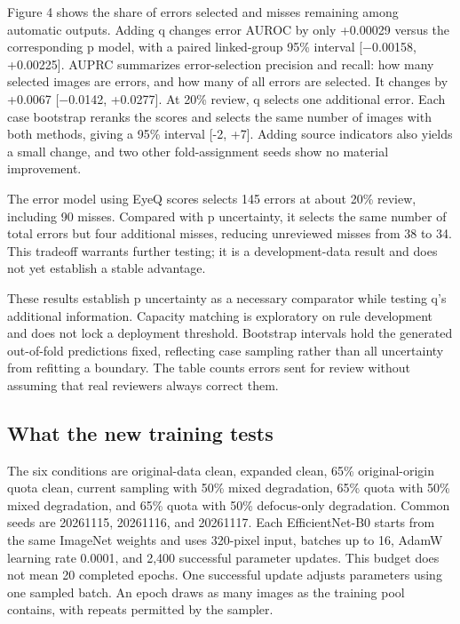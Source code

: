 \documentclass[
  10pt,
]{article}
\begin{document}
Figure 4 shows the share of errors selected and misses remaining among
automatic outputs. Adding q changes error AUROC by only +0.00029 versus
the corresponding p model, with a paired linked-group 95\% interval
{[}−0.00158, +0.00225{]}. AUPRC summarizes error-selection precision and
recall: how many selected images are errors, and how many of all errors
are selected. It changes by +0.0067 {[}−0.0142, +0.0277{]}. At 20\%
review, q selects one additional error. Each case bootstrap reranks the
scores and selects the same number of images with both methods, giving a
95\% interval {[}-2, +7{]}. Adding source indicators also yields a small
change, and two other fold-assignment seeds show no material
improvement.

The error model using EyeQ scores selects 145 errors at about 20\%
review, including 90 misses. Compared with p uncertainty, it selects the
same number of total errors but four additional misses, reducing
unreviewed misses from 38 to 34. This tradeoff warrants further testing;
it is a development-data result and does not yet establish a stable
advantage.

These results establish p uncertainty as a necessary comparator while
testing q's additional information. Capacity matching is exploratory on
rule development and does not lock a deployment threshold. Bootstrap
intervals hold the generated out-of-fold predictions fixed, reflecting
case sampling rather than all uncertainty from refitting a boundary. The
table counts errors sent for review without assuming that real reviewers
always correct them.

\subsection{What the new training
tests}\label{what-the-new-training-tests}

The six conditions are original-data clean, expanded clean, 65\%
original-origin quota clean, current sampling with 50\% mixed
degradation, 65\% quota with 50\% mixed degradation, and 65\% quota with
50\% defocus-only degradation. Common seeds are 20261115, 20261116, and
20261117. Each EfficientNet-B0 starts from the same ImageNet weights and
uses 320-pixel input, batches up to 16, AdamW learning rate 0.0001, and
2,400 successful parameter updates. This budget does not mean 20
completed epochs. One successful update adjusts parameters using one
sampled batch. An epoch draws as many images as the training pool
contains, with repeats permitted by the sampler.
\end{document}

